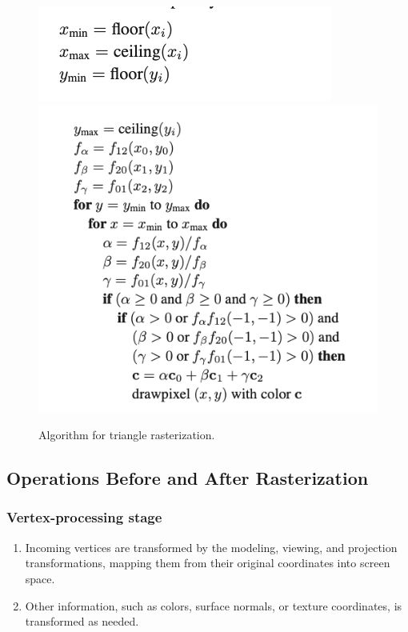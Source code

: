 \documentclass[11pt]{article}
\numberwithin{equation}{section}
\begin{document}
\begin{figure}[H]
	\centering
	\includegraphics[scale=0.5]{p38}\\
	\includegraphics[scale=0.5]{p39}
	\caption{Algorithm for triangle rasterization.}
\end{figure}

\subsection{Operations Before and After Rasterization}
\subsubsection{Vertex-processing stage}
\begin{enumerate}
	\item Incoming vertices are transformed by the modeling, viewing, and projection transformations, mapping them from their original coordinates into screen space.
	\item Other information, such as colors, surface normals, or texture coordinates, is transformed as needed.
\end{enumerate}
\end{document}
